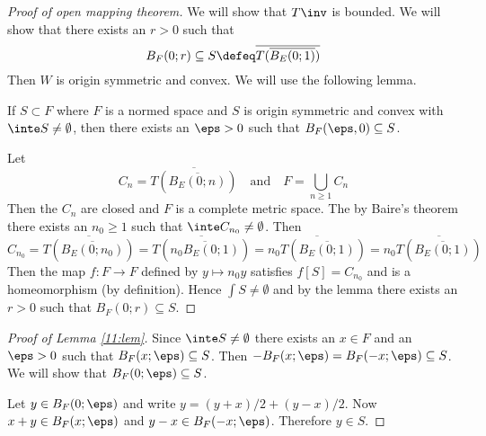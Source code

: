 \begin{proof}[Proof of open mapping theorem]
	We will show that $T\inv$ is bounded.
	We will show that there exists an $r>0$ such that
	\[B_F(0;r) \subseteq S \defeq \overline{T(\overline{B_E(0;1)})}\]
	Then $W$ is origin symmetric and convex.
	We will use the following lemma.
	
\begin{lem}\label{11:lem}
	If $S \subset F$ where $F$ is a normed space and $S$ is origin symmetric and convex with $\inte S \neq \emptyset$, then there exists an $\eps>0$ such that $B_F(\eps,0) \subseteq S$.
\end{lem}
	
	Let
	\[C_n = \overline{T(\overline{B_E(0;n)})} \quad \text{and} \quad F = \bigcup_{n \geq 1} C_n\]
	Then the $C_n$ are closed and $F$ is a complete metric space.
	The by Baire's theorem there exists an $n_0 \geq 1$ such that $\inte C_{n_0} \neq \emptyset$.
	Then
	\[C_{n_0} = \overline{T(\overline{B_E(0;n_0)})} = \overline{T(\overline{n_0B_E(0;1)})} = \overline{n_0T(\overline{B_E(0;1)})} = n_0\overline{T(\overline{B_E(0;1)})}\]
	Then the map $f: F \to F$ defined by $y \mapsto n_0y$ satisfies $f[S]=C_{n_0}$ and is a homeomorphism (by definition).
	Hence $\int S \neq \emptyset$ and by the lemma there exists an $r>0$ such that $B_F(0;r) \subseteq S$.	
\end{proof}

\begin{proof}[Proof of Lemma \ref{11:lem}]
	Since $\inte S \neq \emptyset$ there exists an $x \in F$ and an $\eps>0$ such that $B_F(x;\eps) \subseteq S$.
	Then $-B_F(x;\eps)=B_F(-x;\eps) \subseteq S$.
	We will show that $B_F(0;\eps) \subseteq S$.
	
	Let $y \in B_F(0;\eps)$ and write $y= (y+x)/2+(y-x)/2$.
	Now $x+y \in B_F(x;\eps)$ and $y-x \in B_F(-x;\eps)$.
	Therefore $y \in S$.
\end{proof}
